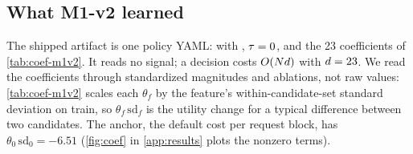 
\subsection{What M1-v2 learned}
\label{sec:res-coefficients}

The shipped artifact is one policy YAML: \lc{} with , $\tau = 0$,
 and the 23 coefficients of \cref{tab:coef-m1v2}. It reads no \ais{}
signal; a decision costs $O(Nd)$ with $d = 23$. We read the
coefficients through standardized magnitudes and ablations, not raw values: \cref{tab:coef-m1v2}
scales each $\theta_f$ by the feature's within-candidate-set standard deviation on train, so
$\theta_f\,\mathrm{sd}_f$ is the utility change for a typical difference between two candidates. The
anchor, the default cost per request block, has $\theta_0\,\mathrm{sd}_0 = -6.51$
(\cref{fig:coef} in \cref{app:results} plots the nonzero terms).

\begin{table}[tbp]
  \centering
  \caption{M1-v2's coefficients. sd$_f$: pooled within-candidate-set standard deviation
    of feature $f$ on train; constraint: the sign rule of \cref{sec:sign-constraint}.}
  \label{tab:coef-m1v2}
  
\end{table}

